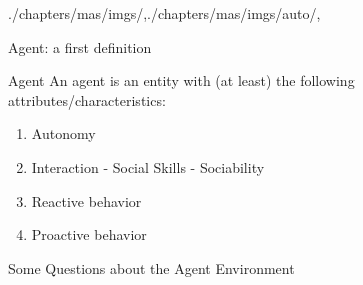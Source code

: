 \begin{graphicspathcontext}{{./chapters/mas/imgs/},{./chapters/mas/imgs/auto/},\old}

\begin{frame}{Agent: a first definition}
	\begin{definitionblock}{Agent \cite{Wooldridge09}}
		An agent is an entity with (at least) the following attributes/characteristics:
		\begin{enumerate}
		\item Autonomy
		\item Interaction - Social Skills - Sociability
		\item Reactive behavior
		\item Proactive behavior
		\end{enumerate}
	\end{definitionblock}
	\vspace{.5cm}	
\end{frame}

\localized


\begin{frame}[t]{{Some Questions} about the Agent Environment}
	\vspace{-.1cm}
	\begin{center}
		\begin{bottomarrowsequence}
		\end{bottomarrowsequence}
	\end{center}
\end{frame}



\end{graphicspathcontext}
